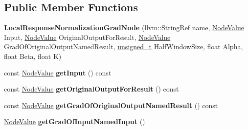 \subsection*{Public Member Functions}
\begin{DoxyCompactItemize}
\item 
\mbox{\label{classglow_1_1_local_response_normalization_grad_node_af8bffa015b9bac13243a8073293043dd}} 
{\bfseries Local\+Response\+Normalization\+Grad\+Node} (llvm\+::\+String\+Ref name, \hyperlink{structglow_1_1_node_value}{Node\+Value} Input, \hyperlink{structglow_1_1_node_value}{Node\+Value} Original\+Output\+For\+Result, \hyperlink{structglow_1_1_node_value}{Node\+Value} Grad\+Of\+Original\+Output\+Named\+Result, \hyperlink{namespaceglow_a0ca574644e1e42ef193a9947fb4d8911}{unsigned\+\_\+t} Half\+Window\+Size, float Alpha, float Beta, float K)
\item 
\mbox{\label{classglow_1_1_local_response_normalization_grad_node_a128b0e92e5fc104fa65f627248601470}} 
const \hyperlink{structglow_1_1_node_value}{Node\+Value} {\bfseries get\+Input} () const
\item 
\mbox{\label{classglow_1_1_local_response_normalization_grad_node_af413e6dcfc218a68fb05d5d21523b967}} 
const \hyperlink{structglow_1_1_node_value}{Node\+Value} {\bfseries get\+Original\+Output\+For\+Result} () const
\item 
\mbox{\label{classglow_1_1_local_response_normalization_grad_node_a1ccb1a8f25dec841b2ee81369d9af1a0}} 
const \hyperlink{structglow_1_1_node_value}{Node\+Value} {\bfseries get\+Grad\+Of\+Original\+Output\+Named\+Result} () const
\item 
\mbox{\label{classglow_1_1_local_response_normalization_grad_node_abf9375ba626b611cdddfe9f7bb415975}} 
\hyperlink{structglow_1_1_node_value}{Node\+Value} {\bfseries get\+Grad\+Of\+Input\+Named\+Input} ()
\item 
\mbox{\label{classglow_1_1_local_response_normalization_grad_node_a6c7720f45b6af682d549796da184f1e5}} 

\end{DoxyCompactItemize}
